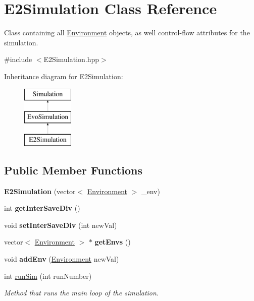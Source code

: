 \hypertarget{classE2Simulation}{}\section{E2\+Simulation Class Reference}
\label{classE2Simulation}


Class containing all \hyperlink{classEnvironment}{Environment} objects, as well control-\/flow attributes for the simulation.  




{\ttfamily \#include $<$E2\+Simulation.\+hpp$>$}

Inheritance diagram for E2\+Simulation\+:\begin{figure}[H]
\begin{center}
\leavevmode
\includegraphics[height=3.000000cm]{classE2Simulation}
\end{center}
\end{figure}
\subsection*{Public Member Functions}
\begin{DoxyCompactItemize}
\item 
\hypertarget{classE2Simulation_a489002277b77dde3163f335eeb174a9c}{}\label{classE2Simulation_a489002277b77dde3163f335eeb174a9c} 
{\bfseries E2\+Simulation} (vector$<$ \hyperlink{classEnvironment}{Environment} $>$ \+\_\+env)
\item 
\hypertarget{classE2Simulation_aa814d76fc89318c950e936ba98adad7c}{}\label{classE2Simulation_aa814d76fc89318c950e936ba98adad7c} 
int {\bfseries get\+Inter\+Save\+Div} ()
\item 
\hypertarget{classE2Simulation_a440ebe2b5d56c6c3c7d67e6463347752}{}\label{classE2Simulation_a440ebe2b5d56c6c3c7d67e6463347752} 
void {\bfseries set\+Inter\+Save\+Div} (int new\+Val)
\item 
\hypertarget{classE2Simulation_a5f07ce9232d20974595ea8191fb93bfe}{}\label{classE2Simulation_a5f07ce9232d20974595ea8191fb93bfe} 
vector$<$ \hyperlink{classEnvironment}{Environment} $>$ $\ast$ {\bfseries get\+Envs} ()
\item 
\hypertarget{classE2Simulation_ad7ce5318a2850d7a73df94aec1c7e15f}{}\label{classE2Simulation_ad7ce5318a2850d7a73df94aec1c7e15f} 
void {\bfseries add\+Env} (\hyperlink{classEnvironment}{Environment} new\+Val)
\item 
int \hyperlink{classE2Simulation_a28028881fd443d2445b562512cb2169c}{run\+Sim} (int run\+Number)
\begin{DoxyCompactList}\small\item\em Method that runs the main loop of the simulation. \end{DoxyCompactList}\end{DoxyCompactItemize}
